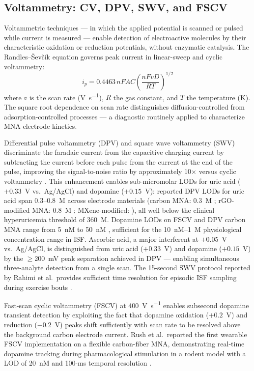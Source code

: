 \documentclass[review,1p]{elsarticle}
\begin{document}
\subsection{Voltammetry: CV, DPV, SWV, and FSCV}
\label{subsec:voltammetry}

Voltammetric techniques — in which the applied potential is scanned or pulsed while current is measured — enable detection of electroactive molecules by their characteristic oxidation or reduction potentials, without enzymatic catalysis. The Randles--\v{S}ev\v{c}\'{i}k equation governs peak current in linear-sweep and cyclic voltammetry:
\begin{equation}
i_p = 0.4463\, nFAC\left(\frac{nFvD}{RT}\right)^{1/2}
\label{eq:randles_sevcik}
\end{equation}
where $v$ is the scan rate (V~s\textsuperscript{$-1$}), $R$ the gas constant, and $T$ the temperature (K). The square root dependence on scan rate distinguishes diffusion-controlled from adsorption-controlled processes — a diagnostic routinely applied to characterize MNA electrode kinetics.

Differential pulse voltammetry (DPV) and square wave voltammetry (SWV) discriminate the faradaic current from the capacitive charging current by subtracting the current before each pulse from the current at the end of the pulse, improving the signal-to-noise ratio by approximately 10$\times$ versus cyclic voltammetry \cite{Zhu2022UA}. This enhancement enables sub-micromolar LODs for uric acid ($+0.33$~V vs.\ Ag/AgCl) and dopamine ($+0.15$~V): reported DPV LODs for uric acid span 0.3--0.8~\textmu{}M across electrode materials (carbon MNA: 0.3~\textmu{}M \cite{Zhu2022UA}; rGO-modified MNA: 0.8~\textmu{}M \cite{Wang2023rGO}; MXene-modified: \cite{Yin2023UA}), all well below the clinical hyperuricemia threshold of 360~\textmu{}M. Dopamine LODs on FSCV and DPV carbon MNA range from 5~nM to 50~nM \cite{Rush2021FSCV}, sufficient for the 10~nM--1~\textmu{}M physiological concentration range in ISF. Ascorbic acid, a major interferent at $+0.05$~V vs.\ Ag/AgCl, is distinguished from uric acid ($+0.33$~V) and dopamine ($+0.15$~V) by the $\geq$200~mV peak separation achieved in DPV — enabling simultaneous three-analyte detection from a single scan. The 15-second SWV protocol reported by Rahimi et al.\ provides sufficient time resolution for episodic ISF sampling during exercise bouts \cite{Rahimi2023}.

Fast-scan cyclic voltammetry (FSCV) at 400~V~s\textsuperscript{$-1$} enables subsecond dopamine transient detection by exploiting the fact that dopamine oxidation ($+0.2$~V) and reduction ($-0.2$~V) peaks shift sufficiently with scan rate to be resolved above the background carbon electrode current. Rush et al.\ reported the first wearable FSCV implementation on a flexible carbon-fiber MNA, demonstrating real-time dopamine tracking during pharmacological stimulation in a rodent model with a LOD of 20~nM and 100-ms temporal resolution \cite{Rush2021FSCV}.
\end{document}
